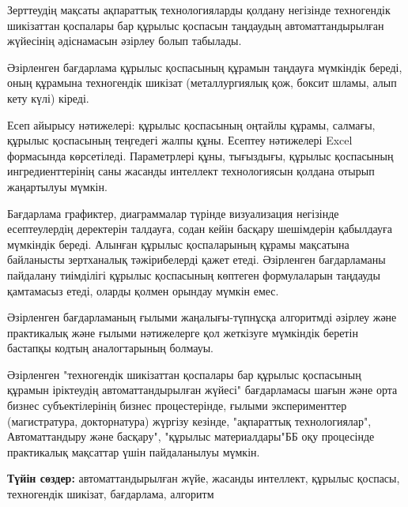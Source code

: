 Зерттеудің мақсаты ақпараттық технологияларды қолдану негізінде
техногендік шикізаттан қоспалары бар құрылыс қоспасын таңдаудың
автоматтандырылған жүйесінің әдіснамасын әзірлеу болып табылады.

Әзірленген бағдарлама құрылыс қоспасының құрамын таңдауға мүмкіндік
береді, оның құрамына техногендік шикізат (металлургиялық қож, боксит
шламы, алып кету күлі) кіреді.

Есеп айырысу нәтижелері: құрылыс қоспасының оңтайлы құрамы, салмағы,
құрылыс қоспасының теңгедегі жалпы құны. Есептеу нәтижелері Excel
формасында көрсетіледі. Параметрлері құны, тығыздығы, құрылыс қоспасының
ингредиенттерінің саны жасанды интеллект технологиясын қолдана отырып
жаңартылуы мүмкін.

Бағдарлама графиктер, диаграммалар түрінде визуализация негізінде
есептеулердің деректерін талдауға, содан кейін басқару шешімдерін
қабылдауға мүмкіндік береді. Алынған құрылыс қоспаларының құрамы
мақсатына байланысты зертханалық тәжірибелерді қажет етеді. Әзірленген
бағдарламаны пайдалану тиімділігі құрылыс қоспасының көптеген
формулаларын таңдауды қамтамасыз етеді, оларды қолмен орындау мүмкін
емес.

Әзірленген бағдарламаның ғылыми жаңалығы-түпнұсқа алгоритмді әзірлеу
және практикалық және ғылыми нәтижелерге қол жеткізуге мүмкіндік беретін
бастапқы кодтың аналогтарының болмауы.

Әзірленген "техногендік шикізаттан қоспалары бар құрылыс қоспасының
құрамын іріктеудің автоматтандырылған жүйесі" бағдарламасы шағын және
орта бизнес субъектілерінің бизнес процестерінде, ғылыми эксперименттер
(магистратура, докторнатура) жүргізу кезінде, "ақпараттық
технологиялар", Автоматтандыру және басқару", "құрылыс материалдары"ББ
оқу процесінде практикалық мақсаттар үшін пайдаланылуы мүмкін.

{\bfseries Түйін сөздер:} автоматтандырылған жүйе, жасанды интеллект,
құрылыс қоспасы, техногендік шикізат, бағдарлама, алгоритм

